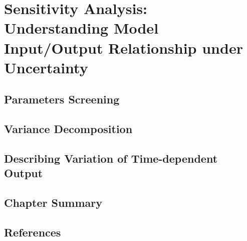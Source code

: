 \chapter{Sensitivity Analysis: Understanding Model Input/Output Relationship under Uncertainty}
\label{ch:sensitivity_analysis}

\section{Parameters Screening}

\section{Variance Decomposition}

\section{Describing Variation of Time-dependent Output}

\section{Chapter Summary}

\section{References}

